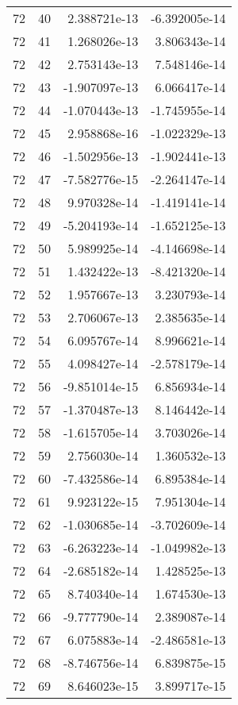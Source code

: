 \begin{tabular}{rrrr}
  72 &   40 &  2.388721e-13 & -6.392005e-14 \\
  72 &   41 &  1.268026e-13 &  3.806343e-14 \\
  72 &   42 &  2.753143e-13 &  7.548146e-14 \\
  72 &   43 & -1.907097e-13 &  6.066417e-14 \\
  72 &   44 & -1.070443e-13 & -1.745955e-14 \\
  72 &   45 &  2.958868e-16 & -1.022329e-13 \\
  72 &   46 & -1.502956e-13 & -1.902441e-13 \\
  72 &   47 & -7.582776e-15 & -2.264147e-14 \\
  72 &   48 &  9.970328e-14 & -1.419141e-14 \\
  72 &   49 & -5.204193e-14 & -1.652125e-13 \\
  72 &   50 &  5.989925e-14 & -4.146698e-14 \\
  72 &   51 &  1.432422e-13 & -8.421320e-14 \\
  72 &   52 &  1.957667e-13 &  3.230793e-14 \\
  72 &   53 &  2.706067e-13 &  2.385635e-14 \\
  72 &   54 &  6.095767e-14 &  8.996621e-14 \\
  72 &   55 &  4.098427e-14 & -2.578179e-14 \\
  72 &   56 & -9.851014e-15 &  6.856934e-14 \\
  72 &   57 & -1.370487e-13 &  8.146442e-14 \\
  72 &   58 & -1.615705e-14 &  3.703026e-14 \\
  72 &   59 &  2.756030e-14 &  1.360532e-13 \\
  72 &   60 & -7.432586e-14 &  6.895384e-14 \\
  72 &   61 &  9.923122e-15 &  7.951304e-14 \\
  72 &   62 & -1.030685e-14 & -3.702609e-14 \\
  72 &   63 & -6.263223e-14 & -1.049982e-13 \\
  72 &   64 & -2.685182e-14 &  1.428525e-13 \\
  72 &   65 &  8.740340e-14 &  1.674530e-13 \\
  72 &   66 & -9.777790e-14 &  2.389087e-14 \\
  72 &   67 &  6.075883e-14 & -2.486581e-13 \\
  72 &   68 & -8.746756e-14 &  6.839875e-15 \\
  72 &   69 &  8.646023e-15 &  3.899717e-15 \\

\end{tabular}
